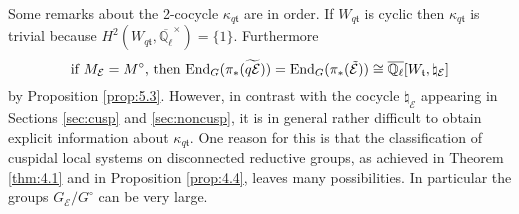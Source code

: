 \documentclass[11pt]{amsart}
\theoremstyle{definition}
\newcommand{\Q}{\mathbb Q}
\def\End{{\rm End}}
\def\cE{{\mathcal E}}
\def\ft{{\mathfrak t}}
\begin{document}
Some remarks about the 2-cocycle $\kappa_{q \ft}$ are in order.
If $W_{q \ft}$ is cyclic then $\kappa_{q \ft}$ is trivial because
$H^2 (W_{q \ft},\overline{\Q_{\ell}}^\times) = \{1\}$. Furthermore
\[
\text{if } M_\cE = M^\circ \text{, then }
\End_G (\pi_* (\widetilde{q \cE})) = \End_G (\pi_* (\tilde{\cE}))
\cong \overline{\Q_{\ell}}[W_\ft,\natural_\cE] 
\]
by Proposition \ref{prop:5.3}.
However, in contrast with the cocycle $\natural_\cE$ appearing in
Sections \ref{sec:cusp} and \ref{sec:noncusp}, it is in general rather
difficult to obtain explicit information about $\kappa_{q \ft}$. One 
reason for this is that the classification of cuspidal local systems
on disconnected reductive groups, as achieved in Theorem \ref{thm:4.1} 
and in Proposition \ref{prop:4.4}, leaves many possibilities. 
In particular the groups $G_\cE / G^\circ$ can be very large.
\end{document}
